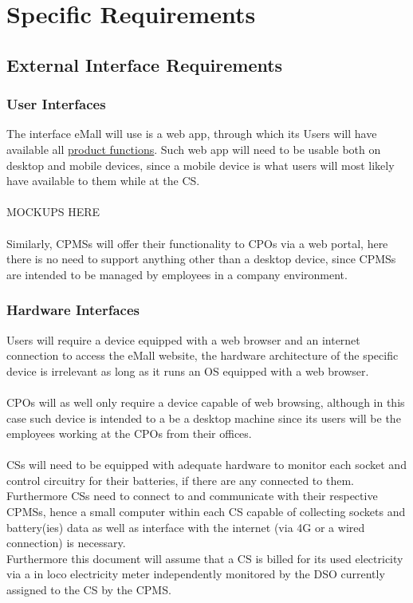 \documentclass[11pt]{article}
\begin{document}
\newpage

\section{Specific Requirements}
\label{section:specificRequirements}

\subsection{External Interface Requirements}

\subsubsection{User Interfaces}

The interface eMall will use is a web app, through which its Users will have available all \hyperref[subsec:prodfunctions]{product functions}. Such web app will need to be usable both on desktop and mobile devices, since a mobile device is what users will most likely have available to them while at the CS. \\
\\
MOCKUPS HERE \\
\\
Similarly, CPMSs will offer their functionality to CPOs via a web portal, here there is no need to support anything other than a desktop device, since CPMSs are intended to be managed by employees in a company environment.

\subsubsection{Hardware Interfaces}

Users will require a device equipped with a web browser and an internet connection to access the eMall website, the hardware architecture of the specific device is irrelevant as long as it runs an OS equipped with a web browser. \\
\\
CPOs will as well only require a device capable of web browsing, although in this case such device is intended to a be a desktop machine since its users will be the employees working at the CPOs from their offices. \\
\\
CSs will need to be equipped with adequate hardware to monitor each socket and control circuitry for their batteries, if there are any connected to them. Furthermore CSs need to connect to and communicate with their respective CPMSs, hence a small computer within each CS capable of collecting sockets and battery(ies) data as well as interface with the internet (via 4G or a wired connection) is necessary. \\
Furthermore this document will assume that a CS is billed for its used electricity via a in loco electricity meter independently monitored by the DSO currently assigned to the CS by the CPMS.
\end{document}
